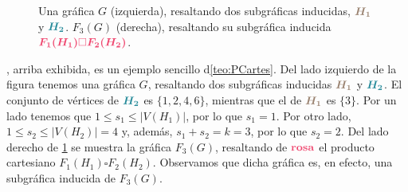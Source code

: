 \begin{figure}[ht!]
    \caption{Una gr\'afica $G$ (izquierda), resaltando dos subgr\'aficas
    inducidas, ${\color{baige}\boldsymbol {H_1}}$ y
    ${\color{azulMetal}\boldsymbol {H_2}}$. $F_3(G)$ (derecha), resaltando su
    subgr\'afica inducida ${\color{fushia}\boldsymbol {F_1(H_1) \square
    F_2(H_2)}}$.}
    \label{fig:ex-cart}
    \end{figure}

, arriba exhibida, es un ejemplo sencillo d\cref{teo:PCartes}.
Del lado izquierdo de la figura tenemos una gr\'afica $G$, resaltando dos
subgr\'aficas inducidas ${\color{baige}\boldsymbol {H_1}}$ y
${\color{azulMetal}\boldsymbol {H_2}}$. El conjunto de v\'ertices de
${\color{azulMetal}\boldsymbol {H_2}}$ es $\{1,2,4,6\}$, mientras que el de
${\color{baige}\boldsymbol {H_1}}$ es $\{3\}$. Por un lado tenemos que $1\leq
s_1 \leq |V(H_1)|$, por lo que $s_1 =1$. Por otro lado, $1\leq s_2 \leq |V(H_2)|
= 4$ y, adem\'as, $s_1+s_2 = k =3$, por lo que $s_2 =2$. Del lado derecho de
\cref{fig:ex-cart} se muestra la gr\'afica $F_3(G)$, resaltando de
$\color{fushia} \bf rosa$ el producto cartesiano $F_1(H_1) \square F_2(H_2)$.
Observamos que dicha gr\'afica es, en efecto, una subgr\'afica inducida de
$F_3(G)$.

